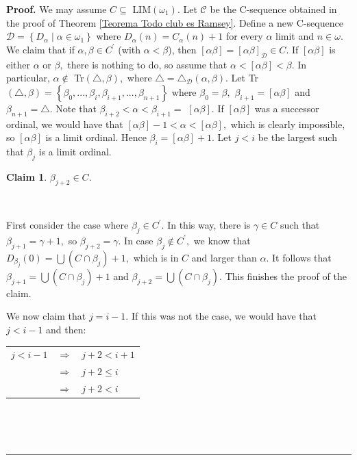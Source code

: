 \documentclass{article}
\newtheorem{claim}[theorem]{Claim}
\newenvironment{proof}[1][Proof]{\noindent\textbf{#1.} }{\ \rule{0.5em}{0.5em}}
\begin{document}
\begin{proof}
We may assume $C\subseteq$ \textsf{LIM}$\left(  \omega_{1}\right)  .$ Let
$\mathcal{C}$ be the \textsf{C}-sequence obtained in the proof of Theorem
\ref{Teorema Todo club es Ramsey}. Define a new \textsf{C}-sequence
$\mathcal{D}=\left\{  D_{\alpha}\mid\alpha\in\omega_{1}\right\}  $ where
$D_{\alpha}\left(  n\right)  =C_{\alpha}\left(  n\right)  +1$ for every
$\alpha$ limit and $n\in\omega.$ We claim that if $\alpha,\beta\in C^{\prime}$
(with $\alpha<\beta$), then $\left[  \alpha\beta\right]  =\left[  \alpha
\beta\right]  _{\mathcal{D}}\in C.$ If $\left[  \alpha\beta\right]  $ is
either $\alpha$ or $\beta,$ there is nothing to do, so assume that
$\alpha<\left[  \alpha\beta\right]  <\beta.$ In particular, $\alpha\notin$
\textsf{Tr}$(\triangle,\beta),$ where $\triangle=\triangle_{\mathcal{D}%
}\left(  \alpha,\beta\right)  .$ Let \textsf{Tr}$(\triangle,\beta)=\left\{
\beta_{0},...,\beta_{i},\beta_{i+1},...,\beta_{n+1}\right\}  $ where
$\beta_{0}=\beta,$ $\beta_{i+1}=\left[  \alpha\beta\right]  $ and $\beta
_{n+1}=\triangle.$ Note that $\beta_{i+2}<\alpha<\beta_{i+1}=$ $\left[
\alpha\beta\right]  .$ If $\left[  \alpha\beta\right]  $ was a successor
ordinal, we would have that $\left[  \alpha\beta\right]  -1<\alpha<\left[
\alpha\beta\right]  ,$ which is clearly impossible, so $\left[  \alpha
\beta\right]  $ is a limit ordinal. Hence $\beta_{i}=\left[  \alpha
\beta\right]  +1.$ Let $j<i$ be the largest such that $\beta_{j}$ is a limit ordinal.

\begin{claim}
$\beta_{j+2}\in C.$
\end{claim}

\qquad\qquad\ \ 

First consider the case where $\beta_{j}\in C^{\prime}.$ In this way, there is
$\gamma\in C$ such that $\beta_{j+1}=\gamma+1,$ so $\beta_{j+2}=\gamma.$ In
case $\beta_{j}\notin C^{\prime},$ we know that $D_{\beta_{j}}\left(
0\right)  =\bigcup\left(  C\cap\beta_{j}\right)  +1,$ which is in $C$ and
larger than $\alpha.$ It follows that $\beta_{j+1}=\bigcup\left(  C\cap
\beta_{j}\right)  +1$ and $\beta_{j+2}=\bigcup\left(  C\cap\beta_{j}\right)
.$ This finishes the proof of the claim.

\qquad\qquad\qquad

We now claim that $j=i-1.$ If this was not the case, we would have that
$j<i-1$ and then:

\hfill%
\begin{tabular}
[c]{lll}%
$j<i-1$ & $\Longrightarrow$ & $j+2<i+1$\\
& $\Longrightarrow$ & $j+2\leq i$\\
& $\Longrightarrow$ & $j+2<i$%
\end{tabular}
\hfill\ 


\end{proof}
\end{document}
